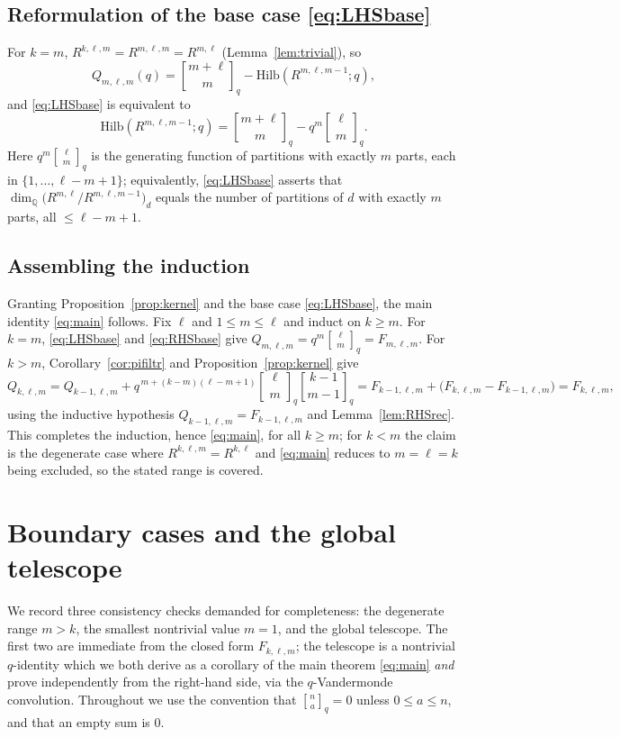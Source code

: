 \documentclass{amsart}
\theoremstyle{definition}
\newcommand{\Hilb}{\mathrm{Hilb}}
\newcommand{\qbin}[2]{\genfrac{[}{]}{0pt}{}{#1}{#2}_q}
\newcommand{\Q}{\mathbb{Q}}
\newcommand{\rkl}{R^{k,\ell}}
\newcommand{\Rklm}{R^{k,\ell,m}}
\begin{document}
\subsection*{Reformulation of the base case \eqref{eq:LHSbase}}
For $k=m$, $\Rklm=R^{m,\ell,m}=R^{m,\ell}$ (Lemma~\ref{lem:trivial}), so
\[
Q_{m,\ell,m}(q)=\qbin{m+\ell}{m}-\Hilb(R^{m,\ell,m-1};q),
\]
and \eqref{eq:LHSbase} is equivalent to
\begin{equation}\label{eq:basecum}
\Hilb(R^{m,\ell,m-1};q)=\qbin{m+\ell}{m}-q^{m}\qbin{\ell}{m}.
\end{equation}
Here $q^{m}\qbin{\ell}{m}$ is the generating function of partitions with exactly $m$
parts, each in $\{1,\dots,\ell-m+1\}$; equivalently, \eqref{eq:LHSbase} asserts that
$\dim_\Q\big(R^{m,\ell}/R^{m,\ell,m-1}\big)_d$ equals the number of partitions of $d$
with exactly $m$ parts, all $\le\ell-m+1$.

\subsection*{Assembling the induction}
Granting Proposition~\ref{prop:kernel} and the base case \eqref{eq:LHSbase}, the main
identity \eqref{eq:main} follows. Fix $\ell$ and $1\le m\le\ell$ and induct on
$k\ge m$. For $k=m$, \eqref{eq:LHSbase} and \eqref{eq:RHSbase} give
$Q_{m,\ell,m}=q^m\qbin{\ell}{m}=F_{m,\ell,m}$. For $k>m$,
Corollary~\ref{cor:pifiltr} and Proposition~\ref{prop:kernel} give
\[
Q_{k,\ell,m}=Q_{k-1,\ell,m}+q^{\,m+(k-m)(\ell-m+1)}\qbin{\ell}{m}\qbin{k-1}{m-1}
=F_{k-1,\ell,m}+\big(F_{k,\ell,m}-F_{k-1,\ell,m}\big)=F_{k,\ell,m},
\]
using the inductive hypothesis $Q_{k-1,\ell,m}=F_{k-1,\ell,m}$ and
Lemma~\ref{lem:RHSrec}. This completes the induction, hence \eqref{eq:main}, for all
$k\ge m$; for $k<m$ the claim is the degenerate case where $\Rklm=\rkl$ and
\eqref{eq:main} reduces to $m=\ell=k$ being excluded, so the stated range is covered.

\section{Boundary cases and the global telescope}
\label{sec:boundary}

We record three consistency checks demanded for completeness: the degenerate
range $m>k$, the smallest nontrivial value $m=1$, and the global telescope. The
first two are immediate from the closed form $F_{k,\ell,m}$; the telescope is a
nontrivial $q$-identity which we both derive as a corollary of the main theorem
\eqref{eq:main} \emph{and} prove independently from the right-hand side, via the
$q$-Vandermonde convolution. Throughout we use the convention that
$\qbin{n}{a}=0$ unless $0\le a\le n$, and that an empty sum is $0$.
\end{document}
